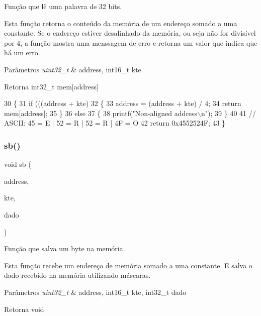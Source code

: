 Função que lê uma palavra de 32 bits. 

Esta função retorna o conteúdo da memória de um endereço somado a uma constante. Se o endereço estiver desalinhado da memória, ou seja não for divisível por 4, a função mostra uma menssagem de erro e retorna um valor que indica que há um erro. 
\begin{DoxyParams}{Parâmetros}
{\em uint32\+\_\+t} & address, int16\+\_\+t kte \\
\hline
\end{DoxyParams}
\begin{DoxyReturn}{Retorna}
int32\+\_\+t mem[address] 
\end{DoxyReturn}

\begin{DoxyCode}
30 \{
31     \textcolor{keywordflow}{if} (((address + kte) %
32     \{
33         address = (address + kte) / 4;
34         \textcolor{keywordflow}{return} mem[address];
35     \}
36     \textcolor{keywordflow}{else}
37     \{
38         printf(\textcolor{stringliteral}{"Non-aligned address\(\backslash\)n"});
39     \}
40 
41     \textcolor{comment}{// ASCII: 45 = E | 52 = R | 52 = R | 4F = O}
42     \textcolor{keywordflow}{return} 0x4552524F;
43 \}
\end{DoxyCode}
\mbox{\label{memory_8c_a2e12d7a7e1b601a6e84cc109450dc570}} 
\subsubsection{sb()}
{\footnotesize\ttfamily void sb (\begin{DoxyParamCaption}\item[{uint32\+\_\+t}]{address,  }\item[{int16\+\_\+t}]{kte,  }\item[{int8\+\_\+t}]{dado }\end{DoxyParamCaption})}



Função que salva um byte na memória. 

Esta função recebe um endereço de memória somado a uma constante. E salva o dado recebido na memória utilizando máscaras. 
\begin{DoxyParams}{Parâmetros}
{\em uint32\+\_\+t} & address, int16\+\_\+t kte, int32\+\_\+t dado \\
\hline
\end{DoxyParams}
\begin{DoxyReturn}{Retorna}
void 
\end{DoxyReturn}

